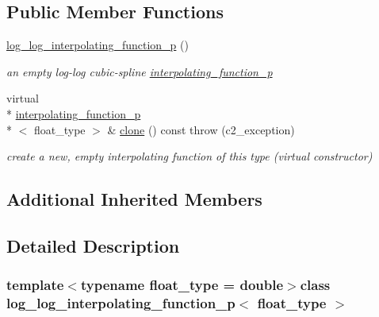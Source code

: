 \subsection*{Public Member Functions}
\begin{DoxyCompactItemize}
\item 
\hypertarget{classlog__log__interpolating__function__p_a7da92b61c290a647a51c027d06463b4e}{\hyperlink{classlog__log__interpolating__function__p_a7da92b61c290a647a51c027d06463b4e}{log\-\_\-log\-\_\-interpolating\-\_\-function\-\_\-p} ()}\label{classlog__log__interpolating__function__p_a7da92b61c290a647a51c027d06463b4e}

\begin{DoxyCompactList}\small\item\em an empty log-\/log cubic-\/spline \hyperlink{classinterpolating__function__p}{interpolating\-\_\-function\-\_\-p} \end{DoxyCompactList}\item 
\hypertarget{classlog__log__interpolating__function__p_a637bcf13085568e0a5e6b9336873221c}{virtual \\*
\hyperlink{classinterpolating__function__p}{interpolating\-\_\-function\-\_\-p}\\*
$<$ float\-\_\-type $>$ \& \hyperlink{classlog__log__interpolating__function__p_a637bcf13085568e0a5e6b9336873221c}{clone} () const   throw (c2\-\_\-exception)}\label{classlog__log__interpolating__function__p_a637bcf13085568e0a5e6b9336873221c}

\begin{DoxyCompactList}\small\item\em create a new, empty interpolating function of this type (virtual constructor) \end{DoxyCompactList}\end{DoxyCompactItemize}
\subsection*{Additional Inherited Members}


\subsection{Detailed Description}
\subsubsection*{template$<$typename float\-\_\-type = double$>$class log\-\_\-log\-\_\-interpolating\-\_\-function\-\_\-p$<$ float\-\_\-type $>$}

